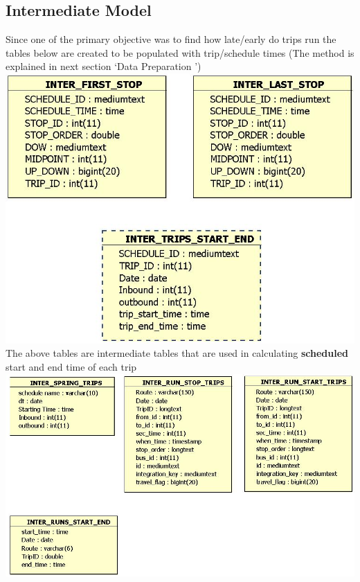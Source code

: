 \documentclass[12pt]{article}
\begin{document}
\subsection{Intermediate Model}
Since one of the primary objective was to find how late/early do trips run the tables below are created to be populated with trip/schedule times (The method is explained in next section \lq Data Preparation \rq)\\
\includegraphics[scale=0.5]{resources/Inter_schedule}\\[1cm] 
The above tables are intermediate tables that are used in calculating \textbf{scheduled} start and end time of each trip\\
\includegraphics[scale=0.5]{resources/Inter_runs}\\[1cm] 
\end{document}
